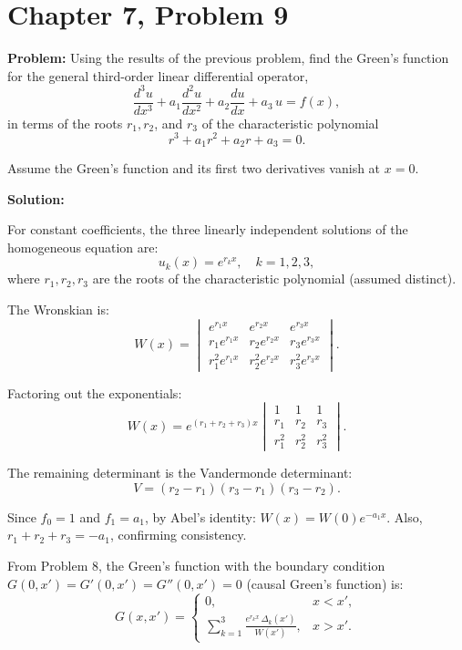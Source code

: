 \documentclass[12pt]{article}
\begin{document}
\section*{Chapter 7, Problem 9}

\textbf{Problem:} Using the results of the previous problem, find the Green's function for the general third-order linear differential operator,
\[
\frac{d^3u}{dx^3} + a_1\frac{d^2u}{dx^2} + a_2\frac{du}{dx} + a_3\,u = f(x),
\]
in terms of the roots $r_1, r_2$, and $r_3$ of the characteristic polynomial
\[
r^3 + a_1 r^2 + a_2 r + a_3 = 0.
\]

Assume the Green's function and its first two derivatives vanish at $x = 0$.

\bigskip
\textbf{Solution:}

For constant coefficients, the three linearly independent solutions of the homogeneous equation are:
\[
u_k(x) = e^{r_k x}, \quad k = 1, 2, 3,
\]
where $r_1, r_2, r_3$ are the roots of the characteristic polynomial (assumed distinct).

The Wronskian is:
\[
W(x) = \begin{vmatrix} e^{r_1 x} & e^{r_2 x} & e^{r_3 x} \\ r_1 e^{r_1 x} & r_2 e^{r_2 x} & r_3 e^{r_3 x} \\ r_1^2 e^{r_1 x} & r_2^2 e^{r_2 x} & r_3^2 e^{r_3 x} \end{vmatrix}.
\]

Factoring out the exponentials:
\[
W(x) = e^{(r_1+r_2+r_3)x}\begin{vmatrix} 1 & 1 & 1 \\ r_1 & r_2 & r_3 \\ r_1^2 & r_2^2 & r_3^2 \end{vmatrix}.
\]

The remaining determinant is the Vandermonde determinant:
\[
V = (r_2 - r_1)(r_3 - r_1)(r_3 - r_2).
\]

Since $f_0 = 1$ and $f_1 = a_1$, by Abel's identity: $W(x) = W(0)e^{-a_1 x}$. Also, $r_1 + r_2 + r_3 = -a_1$, confirming consistency.

From Problem 8, the Green's function with the boundary condition $G(0,x') = G'(0,x') = G''(0,x') = 0$ (causal Green's function) is:
\[
G(x,x') = \begin{cases} 0, & x < x', \\ \displaystyle\sum_{k=1}^{3} \frac{e^{r_k x}\,\Delta_k(x')}{W(x')}, & x > x'. \end{cases}
\]
\end{document}
